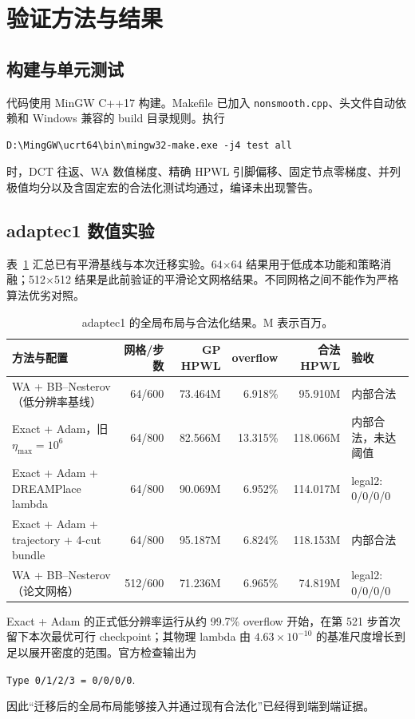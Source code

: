\documentclass[UTF8,a4paper,11pt]{ctexart}
\begin{document}
\section{验证方法与结果}

\subsection{构建与单元测试}

代码使用 MinGW C++17 构建。Makefile 已加入 \texttt{nonsmooth.cpp}、头文件自动依赖和 Windows 兼容的 build 目录规则。执行
\begin{lstlisting}[language={}]
D:\MingGW\ucrt64\bin\mingw32-make.exe -j4 test all
\end{lstlisting}
时，DCT 往返、WA 数值梯度、精确 HPWL 引脚偏移、固定节点零梯度、并列极值均分以及含固定宏的合法化测试均通过，编译未出现警告。

\subsection{adaptec1 数值实验}

表~\ref{tab:results} 汇总已有平滑基线与本次迁移实验。64\(\times\)64 结果用于低成本功能和策略消融；512\(\times\)512 结果是此前验证的平滑论文网格结果。不同网格之间不能作为严格算法优劣对照。

\begin{table}[htbp]
\centering
\small
\caption{adaptec1 的全局布局与合法化结果。M 表示百万。}
\label{tab:results}
\begin{tabularx}{\textwidth}{@{}Xrrrrl@{}}
\toprule
方法与配置 & 网格/步数 & GP HPWL & overflow & 合法 HPWL & 验收 \\
\midrule
WA + BB--Nesterov（低分辨率基线） & 64/600 & 73.464M & 6.918\% & 95.910M & 内部合法 \\
Exact + Adam，旧 \(\eta_{\max}=10^6\) & 64/800 & 82.566M & 13.315\% & 118.066M & 内部合法，未达阈值 \\
Exact + Adam + DREAMPlace lambda & 64/800 & 90.069M & 6.952\% & 114.017M & legal2: 0/0/0/0 \\
Exact + Adam + trajectory + 4-cut bundle & 64/800 & 95.187M & 6.824\% & 118.153M & 内部合法 \\
WA + BB--Nesterov（论文网格） & 512/600 & 71.236M & 6.965\% & 74.819M & legal2: 0/0/0/0 \\
\bottomrule
\end{tabularx}
\end{table}

Exact + Adam 的正式低分辨率运行从约 99.7\% overflow 开始，在第 521 步首次留下本次最优可行 checkpoint；其物理 lambda 由 \(4.63\times10^{-10}\) 的基准尺度增长到足以展开密度的范围。官方检查输出为
\begin{center}
\texttt{Type 0/1/2/3 = 0/0/0/0}.
\end{center}
因此“迁移后的全局布局能够接入并通过现有合法化”已经得到端到端证据。
\end{document}
